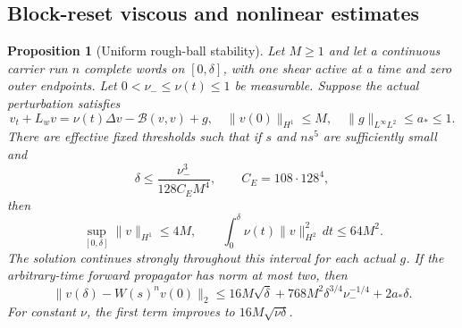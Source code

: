 \documentclass[11pt,a4paper]{amsart}
\newtheorem{proposition}[theorem]{Proposition}
\theoremstyle{definition}
\theoremstyle{remark}
\numberwithin{equation}{section}
\newcommand{\Bcal}{\mathcal B}
\begin{document}
\subsection{Block-reset viscous and nonlinear estimates}

\begin{proposition}[Uniform rough-ball stability]\label{fnd:block-stability}
Let $M\ge1$ and let a continuous carrier run $n$ complete words on $[0,\delta]$, with one shear
active at a time and zero outer endpoints. Let $0<\nu_-\le\nu(t)\le1$ be
measurable. Suppose the actual perturbation satisfies
\begin{equation}
 v_t+L_wv=\nu(t)\Delta v-\Bcal(v,v)+g,
 \quad\|v(0)\|_{H^1}\le M,\quad\|g\|_{L^\infty L^2}\le a_*\le1.
 \label{fnd:perturbation-equation}
\end{equation}
There are effective fixed thresholds such that if $s$ and $ns^5$ are
sufficiently small and
\begin{equation}
 \delta\le\frac{\nu_-^3}{128C_EM^4},\qquad C_E=108\cdot128^4,
 \label{fnd:delta-threshold}
\end{equation}
then
\begin{equation}
 \sup_{[0,\delta]}\|v\|_{H^1}\le4M,\qquad
 \int_0^\delta\nu(t)\|v\|_{H^2}^2\,dt\le64M^2.
 \label{fnd:rough-bound}
\end{equation}
The solution continues strongly throughout this interval for each actual $g$.
If the arbitrary-time forward propagator has norm at most two, then
\begin{equation}
 \|v(\delta)-W(s)^nv(0)\|_2
 \le16M\sqrt{\delta}
       +768M^2\delta^{3/4}\nu_-^{-1/4}+2a_*\delta.
 \label{fnd:endpoint-nonautonomous}
\end{equation}
For constant $\nu$, the first term improves to $16M\sqrt{\nu\delta}$.
\end{proposition}
\end{document}
